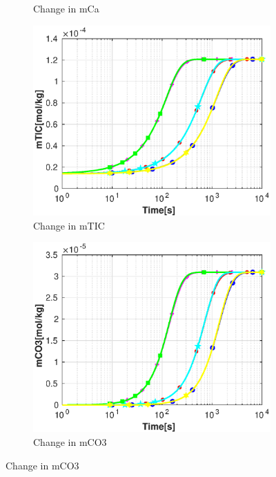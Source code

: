 \begin{figure}
\begin{subfigure}{.5\linewidth}
        \caption{Change in mCa}
        \label{fig:dvmpH7mCa}
    \end{subfigure}%
    \hfill
    \begin{subfigure}{.5\linewidth}
            \centering
        \includegraphics[width=\textwidth]{PICTURES/dvm_pH7_mTIC.eps}
        \caption{Change in mTIC}
        \label{fig:dvmpH7mTIC}
    \end{subfigure}%
    \hfill
    \begin{subfigure}{.5\linewidth}
            \centering
        \includegraphics[width=\textwidth]{PICTURES/dvm_pH7_mCO3.eps}
        \caption{Change in mCO3}

\end{subfigure}
\end{figure}
